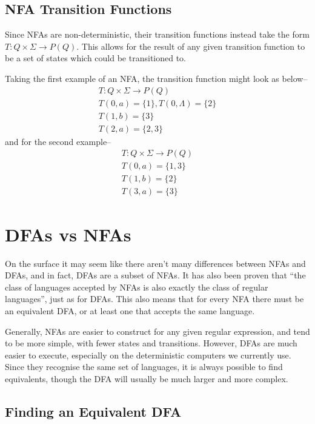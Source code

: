\subsection*{NFA Transition Functions}

Since NFAs are non-deterministic, their transition functions instead take the form $T : Q \times \Sigma \rightarrow P(Q)$.
 This allows for the result of any given transition function to be a set of states which could be transitioned to.

\begin{example*}{}{}
  Taking the first example of an NFA, the transition function might look as below--
  \begin{gather*}
    T : Q \times \Sigma \rightarrow P(Q)\\
    T(0, a) = \{1\}, T(0, \Lambda) = \{2\}\\
    T(1, b) = \{3\}\\
    T(2, a) = \{2, 3\}
  \end{gather*}
  and for the second example--
  \begin{gather*}
    T : Q \times \Sigma \rightarrow P(Q)\\
    T(0, a) = \{1, 3\}\\
    T(1, b) = \{2\}\\
    T(3, a) = \{3\}
  \end{gather*}
\end{example*}

\section*{DFAs vs NFAs}

On the surface it may seem like there aren't many differences between NFAs and DFAs, and in fact, DFAs are a subset of
 NFAs. It has also been proven that ``the class of languages accepted by NFAs is also exactly the class of regular
 languages'', just as for DFAs. This also means that for every NFA there must be an equivalent DFA, or at least one that
 accepts the same language.

Generally, NFAs are easier to construct for any given regular expression, and tend to be more simple, with fewer states
 and transitions. However, DFAs are much easier to execute, especially on the deterministic computers we currently use.
 Since they recognise the same set of languages, it is always possible to find equivalents, though the DFA will usually
 be much larger and more complex.

\subsection*{Finding an Equivalent DFA}

